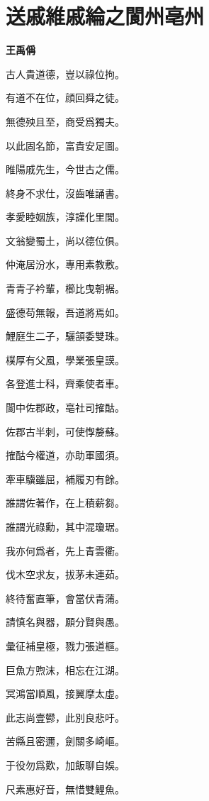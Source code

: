 \documentclass[12pt,a4paper]{ctexbook}
\begin{document}
\section{送戚維戚綸之閬州亳州}
\textbf{王禹偁}\par\vspace{0.5em}
古人貴道德，豈以祿位拘。\par
有道不在位，顔回舜之徒。\par
無德殃且至，商受爲獨夫。\par
以此固名節，富貴安足圖。\par
睢陽戚先生，今世古之儒。\par
終身不求仕，沒齒唯誦書。\par
孝愛睦姻族，淳謹化里閭。\par
文翁變蜀土，尚以德位俱。\par
仲淹居汾水，專用素教敷。\par
青青子衿輩，櫛比曳朝裾。\par
盛德苟無報，吾道將焉如。\par
鯉庭生二子，驪頷委雙珠。\par
樸厚有父風，學業張皇謨。\par
各登進士科，齊乘使者車。\par
閬中佐郡政，亳社司搉酤。\par
佐郡古半刺，可使惸嫠蘇。\par
搉酤今權道，亦助軍國須。\par
牽車驥雖屈，補履刃有餘。\par
誰謂佐著作，在上積薪芻。\par
誰謂光祿勳，其中混瓊琚。\par
我亦何爲者，先上青雲衢。\par
伐木空求友，拔茅未連茹。\par
終待奮直筆，會當伏青蒲。\par
請慎名與器，願分賢與愚。\par
彙征補皇極，戮力張道樞。\par
巨魚方喣沫，相忘在江湖。\par
冥鴻當順風，接翼摩太虛。\par
此志尚壹鬰，此別良悲吁。\par
苦縣且密邇，劍關多崎嶇。\par
于役勿爲歎，加飯聊自娛。\par
尺素惠好音，無惜雙鯉魚。\par
\end{document}

